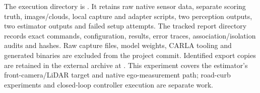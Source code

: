 \documentclass[11pt]{article}
\begin{document}
The execution directory is
. It retains raw
native sensor data, separate scoring truth, images/clouds, local capture and
adapter scripts, two perception outputs, two estimator outputs and failed
setup attempts. The tracked report directory
 records exact commands,
configuration, results, error traces, association/isolation audits and hashes.
Raw capture files, model weights, CARLA tooling and generated binaries are
excluded from the project commit. Identified export copies are retained in
the external archive at
.
This experiment covers the estimator's front-camera/LiDAR target and native
ego-measurement path; road-curb experiments and closed-loop controller
execution are separate work.
\end{document}
